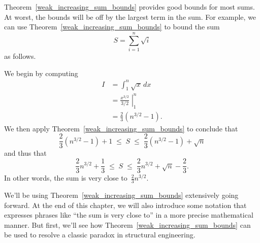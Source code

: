 Theorem~\ref{weak_increasing_sum_bounds} provides good bounds for most sums.  At worst,
the bounds will be off by the largest term in the sum.  For example,
we can use Theorem~\ref{weak_increasing_sum_bounds} to bound the sum
\[
    S = \sum_{i = 1}^n \sqrt{i}
\]
as follows.

We begin by computing
\begin{align*}
    I   &= \int_1^n \sqrt{x} \, dx \\
        &= \left. \frac{x^{3/2}}{3/2} \; \right|_1^n \\
        &= \frac{2}{3} (n^{3/2} - 1).
\end{align*}
We then apply Theorem~\ref{weak_increasing_sum_bounds} to conclude that
\[
    \frac{2}{3} (n^{3/2} - 1) + 1
    \; \le \; S
    \; \le \; \frac{2}{3} (n^{3/2} - 1) + \sqrt{n}
\]
and thus that
\[
    \frac{2}{3} n^{3/2} + \frac{1}{3}
    \; \le \; S
    \; \le \; \frac{2}{3} n^{3/2} + \sqrt{n} - \frac{2}{3}.
\]
In other words, the sum is very close to~$\frac{2}{3} n^{3/2}$.

We'll be using Theorem~\ref{weak_increasing_sum_bounds} extensively going forward.  At
the end of this chapter, we will also introduce some notation that
expresses phrases like ``the sum is very close to'' in a more precise
mathematical manner.  But first, we'll see how Theorem~\ref{weak_increasing_sum_bounds}
can be used to resolve a classic paradox in structural engineering.

\begin{problems}
\practiceproblems
{}

\examproblems
{}

\homeworkproblems
{}

\end{problems}


